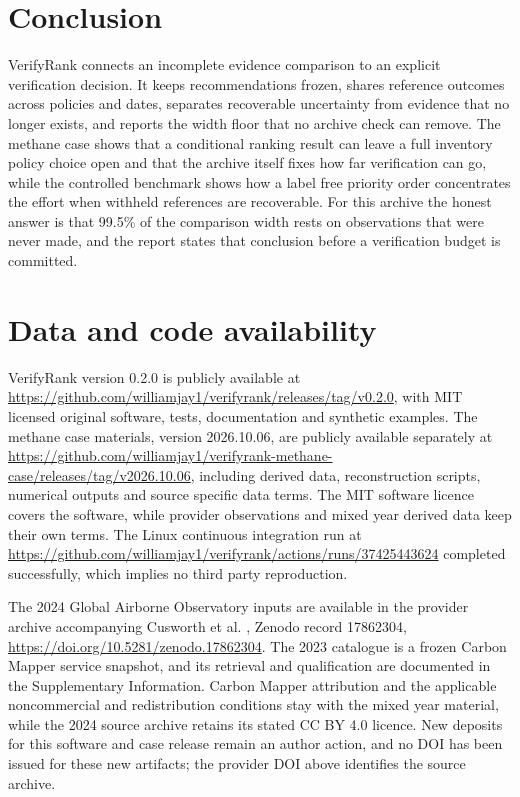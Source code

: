 \documentclass[a4paper,fleqn,longmktitle]{cas-sc}
\begin{document}
\section{Conclusion}\label{sec:conclusion}

VerifyRank connects an incomplete evidence comparison to an explicit verification decision. It keeps recommendations frozen, shares reference outcomes across policies and dates, separates recoverable uncertainty from evidence that no longer exists, and reports the width floor that no archive check can remove. The methane case shows that a conditional ranking result can leave a full inventory policy choice open and that the archive itself fixes how far verification can go, while the controlled benchmark shows how a label free priority order concentrates the effort when withheld references are recoverable. For this archive the honest answer is that 99.5\% of the comparison width rests on observations that were never made, and the report states that conclusion before a verification budget is committed.

\section*{Data and code availability}

VerifyRank version 0.2.0 is publicly available at \url{https://github.com/williamjay1/verifyrank/releases/tag/v0.2.0}, with MIT licensed original software, tests, documentation and synthetic examples. The methane case materials, version 2026.10.06, are publicly available separately at \url{https://github.com/williamjay1/verifyrank-methane-case/releases/tag/v2026.10.06}, including derived data, reconstruction scripts, numerical outputs and source specific data terms. The MIT software licence covers the software, while provider observations and mixed year derived data keep their own terms. The Linux continuous integration run at \url{https://github.com/williamjay1/verifyrank/actions/runs/37425443624} completed successfully, which implies no third party reproduction.

The 2024 Global Airborne Observatory inputs are available in the provider archive accompanying Cusworth et al. \citep{cusworth2026}, Zenodo record 17862304, \url{https://doi.org/10.5281/zenodo.17862304}. The 2023 catalogue is a frozen Carbon Mapper service snapshot, and its retrieval and qualification are documented in the Supplementary Information. Carbon Mapper attribution and the applicable noncommercial and redistribution conditions stay with the mixed year material, while the 2024 source archive retains its stated CC BY 4.0 licence. New deposits for this software and case release remain an author action, and no DOI has been issued for these new artifacts; the provider DOI above identifies the source archive.
\end{document}
